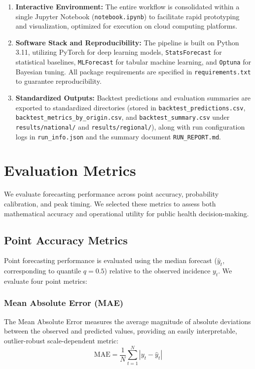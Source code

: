 \begin{enumerate}
    \item \textbf{Interactive Environment:} The entire workflow is consolidated within a single Jupyter Notebook (\texttt{notebook.ipynb}) to facilitate rapid prototyping and visualization, optimized for execution on cloud computing platforms.
    \item \textbf{Software Stack and Reproducibility:} The pipeline is built on Python 3.11, utilizing PyTorch for deep learning models, \texttt{StatsForecast} for statistical baselines, \texttt{MLForecast} for tabular machine learning, and \texttt{Optuna} for Bayesian tuning. All package requirements are specified in \texttt{requirements.txt} to guarantee reproducibility.
    \item \textbf{Standardized Outputs:} Backtest predictions and evaluation summaries are exported to standardized directories (stored in \texttt{backtest\_predictions.csv}, \texttt{backtest\_metrics\_by\_origin.csv}, and \texttt{backtest\_summary.csv} under \texttt{results/national/} and \texttt{results/regional/}), along with run configuration logs in \texttt{run\_info.json} and the summary document \texttt{RUN\_REPORT.md}.
\end{enumerate}


\section{Evaluation Metrics}

We evaluate forecasting performance across point accuracy, probability calibration, and peak timing. We selected these metrics to assess both mathematical accuracy and operational utility for public health decision-making.

\subsection{Point Accuracy Metrics}
Point forecasting performance is evaluated using the median forecast ($\hat{y}_t$, corresponding to quantile $q=0.5$) relative to the observed incidence $y_t$. We evaluate four point metrics:

\subsubsection{Mean Absolute Error (MAE)}
The Mean Absolute Error measures the average magnitude of absolute deviations between the observed and predicted values, providing an easily interpretable, outlier-robust scale-dependent metric:
\begin{equation}
\text{MAE} = \frac{1}{N}\sum_{t=1}^N |y_t - \hat{y}_t|
\end{equation}

